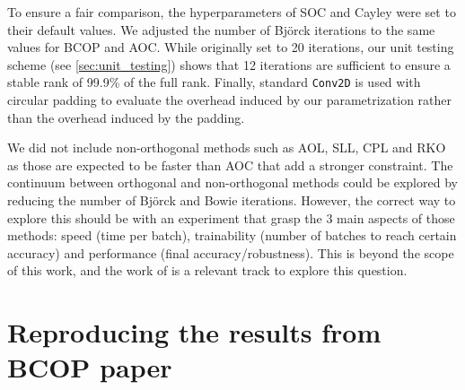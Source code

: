     To ensure a fair comparison, the hyperparameters of SOC and Cayley were set to their default values. We adjusted the number of Björck iterations to the same values for BCOP and AOC. While originally set to 20 iterations, our unit testing scheme (see  \cref{sec:unit_testing}) shows that 12 iterations are sufficient to ensure a stable rank \cite{sanyalstable} of 99.9\% of the full rank. Finally, standard \texttt{Conv2D} is used with circular padding to evaluate the overhead induced by our parametrization rather than the overhead induced by the padding.

    We did not include non-orthogonal methods such as AOL, SLL, CPL and RKO \cite{prach_1-lipschitz_2023, araujo_unified_2023, meunier_dynamical_2022, serrurier_achieving_2021} as those are expected to be faster than AOC that add a stronger constraint. The continuum between orthogonal and non-orthogonal methods could be explored by reducing the number of Björck and Bowie iterations. However, the correct way to explore this should be with an experiment that grasp the 3 main aspects of those methods: speed (time per batch), trainability (number of batches to reach certain accuracy) and performance (final accuracy/robustness). This is beyond the scope of this work, and the work of \cite{prach_1-lipschitz_2023} is a relevant track to explore this question. 


\section{Reproducing the results from BCOP paper}\label{ap:repoducing_bcop}
    
